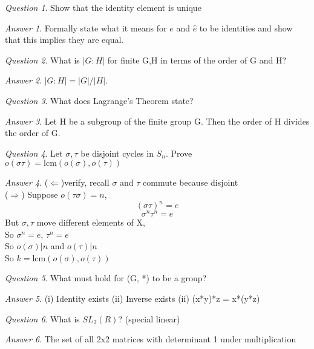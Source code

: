 \documentclass[]{article}
\theoremstyle{remark}
\theoremstyle{qnstyle}
\newtheorem{question}{Question}
\theoremstyle{answerstyle}
\newtheorem*{answer}{Answer}
\begin{document}
{
    \begin{question}
        Show that the identity element is unique
    \end{question}
    \begin{answer}
        Formally state what it means for $e$ and $\hat{e}$ to be identities and show that this implies they are equal.
    \end{answer}
}
{
    \begin{question}
        What is $|G:H|$ for finite G,H in terms of the order of G and H?
    \end{question}
    \begin{answer}
        $|G:H| = |G|/|H|$.
    \end{answer}
}
{
    \begin{question}
        What does Lagrange's Theorem state?
    \end{question}
    \begin{answer}
        Let H be a subgroup of the finite group G. Then the order of H divides the order of G.
    \end{answer}
}
{
    \begin{question}
        Let $\sigma, \tau$ be disjoint cycles in $S_n$. Prove $o(\sigma \tau) = \text{lcm}(o(\sigma), o(\tau))$
    \end{question}
    \begin{answer}
        ($\Leftarrow$)verify, recall $\sigma$ and $\tau$ commute because disjoint \\
        ($\Rightarrow$) Suppose $o(\tau \sigma) = n$,
        $$(\sigma \tau)^n = e$$
        $$\sigma^n \tau^n = e$$
        But $\sigma, \tau$ move different elements of X,\\
        So $\sigma^n = e$, $\tau^n = e$\\
        So $o(\sigma) \vert n$ and $o(\tau) \vert n$\\
        So $k = \text{lcm}(o(\sigma), o(\tau))$
    \end{answer}
}
{
    \begin{question}
        What must hold for (G, *) to be a group?
    \end{question}
    \begin{answer}
        (i) Identity exists
        (ii) Inverse exists
        (ii) (x*y)*z = x*(y*z)
    \end{answer}
}
{
    \begin{question}
        What is $SL_2(R)$? (special linear)
    \end{question}
    \begin{answer}
        The set of all 2x2 matrices with determinant 1 under multiplication
    \end{answer}
}
\end{document}
